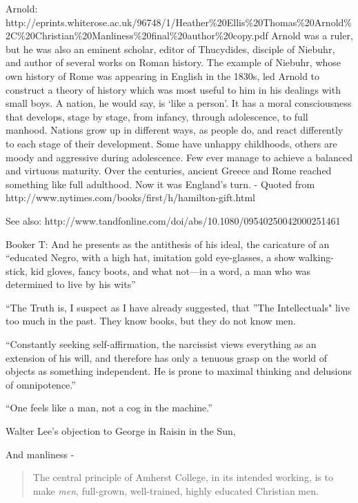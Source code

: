 Arnold: http:\slash \slash eprints.whiterose.ac.uk\slash 96748\slash 1\slash Heather\%20Ellis\%20Thomas\%20Arnold\%2C\%20Christian\%20Manliness\%20final\%20author\%20copy.pdf
Arnold was a ruler, but he was also an eminent scholar, editor of Thucydides, disciple of Niebuhr, and author of several works on Roman history. The example of Niebuhr, whose own history of Rome was appearing in English in the 1830s, led Arnold to construct a theory of history which was most useful to him in his dealings with small boys. A nation, he would say, is `like a person'. It has a moral consciousness that develops, stage by stage, from infancy, through adolescence, to full manhood. Nations grow up in different ways, as people do, and react differently to each stage of their development. Some have unhappy childhoods, others are moody and aggressive during adolescence. Few ever manage to achieve a balanced and virtuous maturity. Over the centuries, ancient Greece and Rome reached something like full adulthood. Now it was England's turn. - Quoted from http:\slash \slash www.nytimes.com\slash books\slash first\slash h\slash hamilton-gift.html

See also: http:\slash \slash www.tandfonline.com\slash doi\slash abs\slash 10.1080\slash 09540250042000251461

Booker T:
And he presents as the antithesis of his ideal, the caricature of an ``educated Negro, with a high hat, imitation gold eye-glasses, a show walking-stick, kid gloves, fancy boots, and what not---in a word, a man who was determined to live by his wits'' ~\citep[p. 70]{Washington:1952uf}

``The Truth is, I suspect as I have already suggested, that ''The Intellectuals" live too much in the past. They know books, but they do not know men. ~\citep[P. 127]{Washington:1911wz}

``Constantly seeking self-affirmation, the narcissist views everything as an extension of his will, and therefore has only a tenuous grasp on the world of objects as something independent. He is prone to maximal thinking and delusions of omnipotence.'' ~\citep[P. 16]{Crawford:2009tz}

``One feels like a man, not a cog in the machine.'' ~\citep[P. 53]{Crawford:2009tz}

Walter Lee's objection to George in Raisin in the Sun, ~\citep[p. 83--85]{Hansberry:1958vt}

And manliness - 

\begin{quote}

The central principle of Amherst College, in its intended working, is to make \emph{men}, full-grown, well-trained, highly educated Christian men. ~\citep[Italics in original, p. 3]{Stearns:1859vma}
\end{quote}

